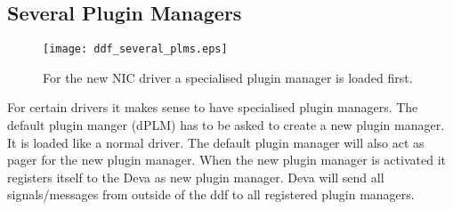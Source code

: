 \subsection{Several Plugin Managers}

\begin{figure}
  \begin{center}
    \leavevmode 
    \texttt{[image: ddf\_several\_plms.eps]}
  \end{center}
  \caption[Several plugin managers]{For the new NIC driver a
  specialised plugin manager is loaded first.}
  \label{fig:ddf_several_plms}
\end{figure}

For certain drivers it makes sense to have specialised plugin
managers.  The default plugin manger (dPLM) has to be asked to create
a new plugin manager.  It is loaded like a normal driver.  The default
plugin manager will also act as pager for the new plugin manager.
When the new plugin manager is activated it registers itself to the
Deva as new plugin manager.  Deva will send all signals/messages from
outside of the ddf to all registered plugin managers.
